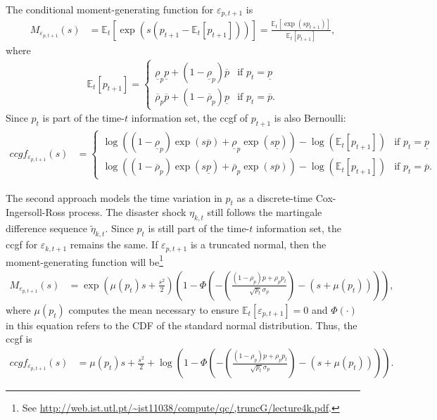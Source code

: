 \documentclass[12 pt, oneside]{article}
\theoremstyle{definition}
\theoremstyle{definition}
\theoremstyle{definition}
\newcommand{\E}{\mathbb{E}}
\begin{document}
The conditional moment-generating function for $\varepsilon_{p, t + 1}$ is
\begin{align*}
  M_{\varepsilon_{p, t + 1}}(s) & = \E_t[\exp(s (p_{t + 1} - \E_t[p_{t + 1}]))] = \frac{\E_t[\exp(s p_{t + 1})]}{\E_t[p_{t + 1}]},
\end{align*}
where
\begin{align*}
  \E_t[p_{t + 1}] =
  \begin{cases}
    \underline{\rho}_p \underline{p} + (1 - \underline{\rho}_p) \overline{p} & \text{if } p_t = \underline{p}\\
    \overline{\rho}_p \overline{p} + (1 - \overline{\rho}_p) \underline{p} & \text{if } p_t = \overline{p}.
  \end{cases}
\end{align*}
Since $p_t$ is part of the time-$t$ information set, the ccgf of $p_{t + 1}$ is also Bernoulli:
\begin{align}\label{eq:ccgf bernoulli disaster probability}
  ccgf_{\varepsilon_{p, t + 1}}(s) & =
                                     \begin{cases}
                                       \log((1 - \underline{\rho}_p) \exp(s \overline{p}) + \underline{\rho}_p\exp(s \underline{p}))  - \log(\E_t[p_{t + 1}]) & \text{if } p_t = \underline{p}\\
                                       \log((1 - \overline{\rho}_p) \exp(s \underline{p}) + \overline{\rho}_p\exp(s \overline{p}))  - \log(\E_t[p_{t + 1}]) & \text{if } p_t = \overline{p}.
                                     \end{cases}
\end{align}


The second approach models the time variation in $p_t$ as a discrete-time Cox-Ingersoll-Ross process. The disaster shock $\eta_{k, t}$ still follows the martingale difference sequence $\tilde{\eta}_{k, t}$. Since $p_t$ is still part of the time-$t$ information set, the ccgf for $\varepsilon_{k, t + 1}$ remains the same. If $\varepsilon_{p, t + 1}$ is a truncated normal, then the moment-generating function will be\footnote{See \url{http://web.ist.utl.pt/~ist11038/compute/qc/,truncG/lecture4k.pdf}.}
\begin{align*}
  M_{\varepsilon_{p, t + 1}}(s) & = \exp\left( \mu(p_t) s + \frac{s^2}{2}\right)\left(1 - \Phi\left(-\left(\frac{(1 - \rho_p)p + \rho_p p_t}{\sqrt{p_t} \sigma_p}\right) - (s + \mu(p_t))\right)\right),
\end{align*}
where $\mu(p_t)$ computes the mean necessary to ensure $\E_t[\varepsilon_{p, t + 1}] = 0$ and $\Phi(\cdot)$ in this equation refers to the CDF of the standard normal distribution. Thus, the ccgf is
\begin{align}
  ccgf_{\varepsilon_{p, t + 1}}(s) & =  \mu(p_t) s + \frac{s^2}{2} + \log\left(1 - \Phi\left(-\left(\frac{(1 - \rho_p)p + \rho_p p_t}{\sqrt{p_t} \sigma_p}\right) - (s + \mu(p_t))\right)\right).
\end{align}
\end{document}
